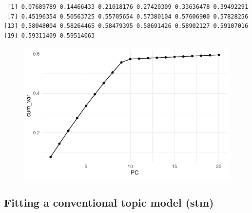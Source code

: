 \documentclass[
]{article}
\newenvironment{Shaded}{\begin{snugshade}}{\end{snugshade}}
\newcommand{\AttributeTok}[1]{\textcolor[rgb]{0.40,0.45,0.13}{#1}}
\newcommand{\DecValTok}[1]{\textcolor[rgb]{0.68,0.00,0.00}{#1}}
\newcommand{\FunctionTok}[1]{\textcolor[rgb]{0.28,0.35,0.67}{#1}}
\newcommand{\NormalTok}[1]{\textcolor[rgb]{0.00,0.23,0.31}{#1}}
\newcommand{\SpecialCharTok}[1]{\textcolor[rgb]{0.37,0.37,0.37}{#1}}
\begin{document}
\begin{verbatim}
 [1] 0.07689789 0.14466433 0.21018176 0.27420309 0.33636478 0.39492291
 [7] 0.45196354 0.50563725 0.55705654 0.57380104 0.57606900 0.57828256
[13] 0.58048004 0.58264465 0.58479395 0.58691426 0.58902127 0.59107016
[19] 0.59311409 0.59514063
\end{verbatim}

\begin{Shaded}
\end{Shaded}

\begin{figure}[H]

{\centering \includegraphics{paper_files/figure-pdf/unnamed-chunk-12-1.pdf}

}

\end{figure}

\hypertarget{fitting-a-conventional-topic-model-stm}{%
\subsection{Fitting a conventional topic model
(stm)}\label{fitting-a-conventional-topic-model-stm}}
\end{document}
